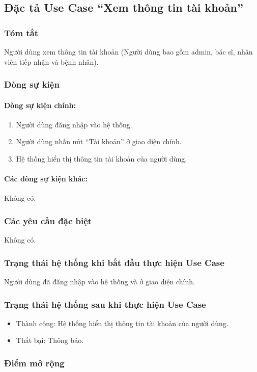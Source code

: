 \subsection{Đặc tả Use Case ``Xem thông tin tài khoản''}

\subsubsection{Tóm tắt}
Người dùng xem thông tin tài khoản (Người dùng bao gồm admin, bác sĩ, nhân viên tiếp nhận và bệnh nhân).

\subsubsection{Dòng sự kiện}
\paragraph{\textbf{Dòng sự kiện chính:}}
\begin{enumerate}
    \item Người dùng đăng nhập vào hệ thống.
    \item Người dùng nhấn nút ``Tài khoản'' ở giao diện chính.
    \item Hệ thống hiển thị thông tin tài khoản của người dùng.
\end{enumerate}

\paragraph{\textbf{Các dòng sự kiện khác:}}
Không có.

\subsubsection{Các yêu cầu đặc biệt}
Không có.

\subsubsection{Trạng thái hệ thống khi bắt đầu thực hiện Use Case}
Người dùng đã đăng nhập vào hệ thống và ở giao diện chính.

\subsubsection{Trạng thái hệ thống sau khi thực hiện Use Case}
\begin{itemize}
    \item Thành công: Hệ thống hiển thị thông tin tài khoản của người dùng.
    \item Thất bại: Thông báo.
\end{itemize}

\subsubsection{Điểm mở rộng}